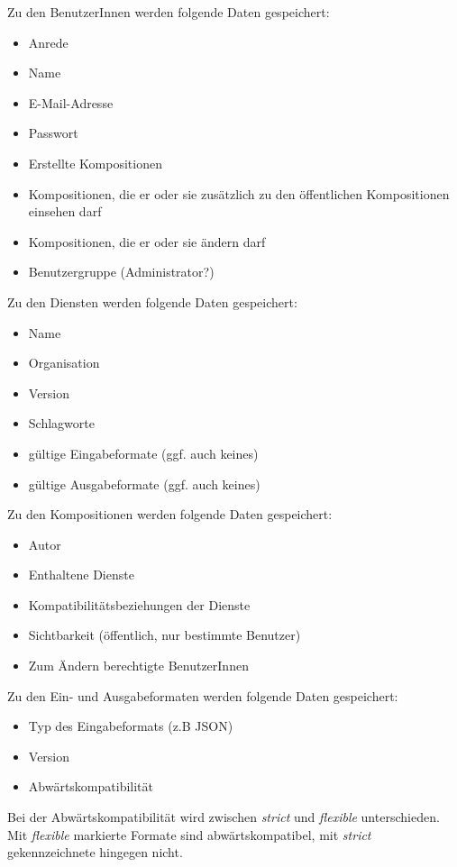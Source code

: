 Zu den BenutzerInnen werden folgende Daten gespeichert:
\begin{itemize}
	\item Anrede
	\item Name
	\item E-Mail-Adresse
	\item Passwort
	\item Erstellte Kompositionen
	\item Kompositionen, die er oder sie zusätzlich zu den öffentlichen Kompositionen einsehen darf
	\item Kompositionen, die er oder sie ändern darf
	\item Benutzergruppe (Administrator?)
\end{itemize}
Zu den Diensten werden folgende Daten gespeichert:
\begin{itemize}
	\item Name
	\item Organisation
	\item Version
	\item Schlagworte
	\item gültige Eingabeformate (ggf. auch keines)
	\item gültige Ausgabeformate (ggf. auch keines)
\end{itemize}
Zu den Kompositionen werden folgende Daten gespeichert:
\begin{itemize}
	\item Autor
	\item Enthaltene Dienste
	\item Kompatibilitätsbeziehungen der Dienste
	\item Sichtbarkeit (öffentlich, nur bestimmte Benutzer)
	\item Zum Ändern berechtigte BenutzerInnen
\end{itemize}

Zu den Ein- und Ausgabeformaten werden folgende Daten gespeichert:
\begin{itemize}
	\item Typ des Eingabeformats (z.B JSON)
	\item Version
	\item Abwärtskompatibilität
\end{itemize}
Bei der Abwärtskompatibilität wird zwischen \textit{strict} und \textit{flexible} unterschieden. Mit \textit{flexible} markierte Formate sind abwärtskompatibel, mit \textit{strict} gekennzeichnete hingegen nicht.
